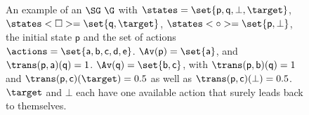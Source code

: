 \begin{figure}[h]

\centering
{}
\caption{An example of an $\SG~\G$ with $\states = \set{\mathsf{p},\mathsf{q},\bot,\target}$, $\states<\Box> = \set{\mathsf{q},\target}$, $\states<\circ> = \set{\mathsf{p},\bot}$, the initial state $\mathsf{p}$ and the set of actions $\actions = \set{\mathsf{a},\mathsf{b},\mathsf{c},\mathsf{d},\mathsf{e}}$. $\Av(\mathsf{p})=\set{\mathsf{a}}$, and $\trans(\mathsf{p},\mathsf{a})(\mathsf{q})=1$. $\Av(\mathsf{q})=\set{\mathsf{b},\mathsf{c}}$, with $\trans(\mathsf{p},\mathsf{b})(\mathsf{q})=1$ and $\trans(\mathsf{p},\mathsf{c})(\target)=0.5$ as well as $\trans(\mathsf{p},\mathsf{c})(\bot)=0.5$. $\target$ and $\bot$ each have one available action that surely leads back to themselves.}
\label{ex:littleBCEC}
\end{figure}



\iffalse

VI from below in two steps
BVI fails, Illusion
BRTDP below in one simulation if we go to 0, could also never go to 0 and never terminate from below; but this a.s. does not happen; also fails from above

More examples: 
	- VI off by 1 CHECK (red edge smaller than two times epsilon (depends on how term crit is implemented); then two iterations (one to propagate 0.5 to C, one to propagate a very small number to q) => ``no'' change => result 0)
	- littleqCEC with selfloop (takes forever to converge) CHECK
	- Converging EC (Prelim and BVIwo) CHECK
	- Complex BCEC (5 States, without starting state, with a b c d on the exits; also for the things are equal case) CHECK
\fi